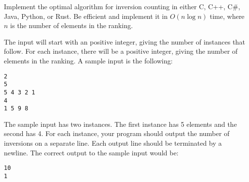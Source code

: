 \documentclass[solutionorbox,answers]{exam}
\begin{document}
\begin{questions}

  \question Implement the optimal algorithm for inversion counting in either C, C++, C\#, Java, Python, or Rust. Be efficient and implement it in $O(n \log n)$ time, where $n$ is the number of elements in the ranking.

The input will start with an positive integer, giving the number of instances that follow. For each
instance, there will be a positive integer, giving the number of elements in the ranking. 
A sample input is the following:
\begin{verbatim}
2
5
5 4 3 2 1
4
1 5 9 8
\end{verbatim}

The sample input has two instances. The first instance has 5 elements and the second has 4.
For each instance, your program should output the number of inversions on a separate line.
Each output line should be terminated by a newline. The correct output to the sample input would be:

\begin{verbatim}
10
1
\end{verbatim}

\end{questions}
\end{document}
